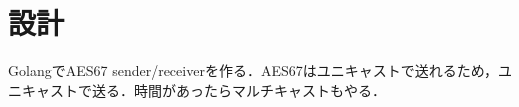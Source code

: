 \chapter{設計}
\label{chap:design}

GolangでAES67 sender/receiverを作る．AES67はユニキャストで送れるため，ユニキャストで送る．時間があったらマルチキャストもやる．
